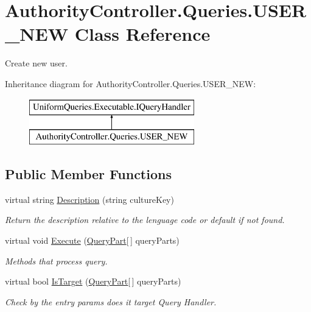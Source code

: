 \hypertarget{class_authority_controller_1_1_queries_1_1_u_s_e_r___n_e_w}{}\section{Authority\+Controller.\+Queries.\+U\+S\+E\+R\+\_\+\+N\+EW Class Reference}
\label{class_authority_controller_1_1_queries_1_1_u_s_e_r___n_e_w}


Create new user.  


Inheritance diagram for Authority\+Controller.\+Queries.\+U\+S\+E\+R\+\_\+\+N\+EW\+:\begin{figure}[H]
\begin{center}
\leavevmode
\includegraphics[height=2.000000cm]{d1/d07/class_authority_controller_1_1_queries_1_1_u_s_e_r___n_e_w}
\end{center}
\end{figure}
\subsection*{Public Member Functions}
\begin{DoxyCompactItemize}
\item 
virtual string \mbox{\hyperlink{class_authority_controller_1_1_queries_1_1_u_s_e_r___n_e_w_a16439c165f3ac2ca8b586dd8bfd2bf55}{Description}} (string culture\+Key)
\begin{DoxyCompactList}\small\item\em Return the description relative to the lenguage code or default if not found. \end{DoxyCompactList}\item 
virtual void \mbox{\hyperlink{class_authority_controller_1_1_queries_1_1_u_s_e_r___n_e_w_a05ffc1bd68a9d937aee817c05f273005}{Execute}} (\mbox{\hyperlink{struct_uniform_queries_1_1_query_part}{Query\+Part}}\mbox{[}$\,$\mbox{]} query\+Parts)
\begin{DoxyCompactList}\small\item\em Methods that process query. \end{DoxyCompactList}\item 
virtual bool \mbox{\hyperlink{class_authority_controller_1_1_queries_1_1_u_s_e_r___n_e_w_a279a4acc2e4cad572f9760e62062d8e8}{Is\+Target}} (\mbox{\hyperlink{struct_uniform_queries_1_1_query_part}{Query\+Part}}\mbox{[}$\,$\mbox{]} query\+Parts)
\begin{DoxyCompactList}\small\item\em Check by the entry params does it target Query Handler. \end{DoxyCompactList}\end{DoxyCompactItemize}


